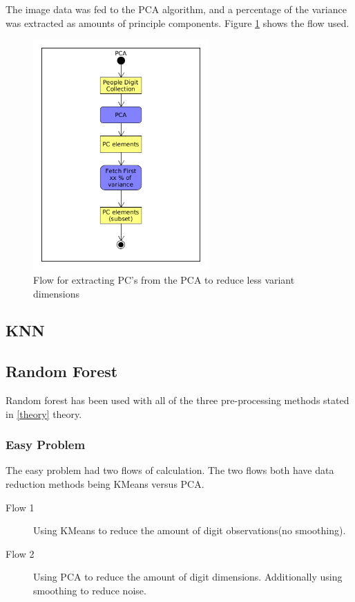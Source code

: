 \documentclass[report]{subfiles}
\begin{document}
The image data was fed to the PCA algorithm, and a percentage of the variance was extracted as amounts of principle components. Figure \ref{fig:pca} shows the flow used.

\begin{figure}
  \centering
  \includegraphics[width=0.6\textwidth]{UML/PCA}
  \caption{Flow for extracting PC's from the PCA to reduce less variant dimensions}
  \label{fig:pca}
\end{figure}

\subsection{KNN}

\subsection{Random Forest}
Random forest has been used with all of the three pre-processing methods stated in \ref{theory} \refname{theory}.

\subsubsection{Easy Problem}

The easy problem had two flows of calculation. The two flows both have data reduction methods being KMeans versus PCA.

\begin{description}
\item[Flow 1] Using KMeans to reduce the amount of digit observations(no smoothing).
\item[Flow 2] Using PCA to reduce the amount of digit dimensions. Additionally using smoothing to reduce noise.
\end{description}
\end{document}
